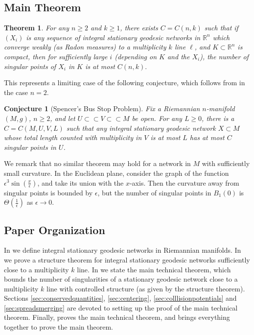 \documentclass[11pt,reqno,twoside]{amsart}
\newtheorem{theorem}[lemma]{Theorem}
\newtheorem{conjecture}[lemma]{Conjecture}
\theoremstyle{definition}
\begin{document}
\subsection{Main Theorem}

\begin{theorem} \label{maintheoremfinal}
    For any $n \geq 2$ and $k \geq 1$, there exists $C = C(n,k)$ such that if $(X_i)$ is any sequence of integral stationary geodesic networks in $\mathbb{R}^n$ which converge weakly (as Radon measures) to a multiplicity $k$ line $\ell$, and $K \subset \mathbb{R}^n$ is compact, then for sufficiently large $i$ (depending on $K$ and the $X_i$), the number of singular points of $X_i$ in $K$ is at most $C(n,k).$
\end{theorem}

This represents a limiting case of the following conjecture, which follows from \cite{frolov2026geodesicnetseuclideanplane} in the case $n=2$.

\begin{conjecture}[Spencer's Bus Stop Problem]
Fix a Riemannian $n$-manifold $(M,g)$, $n \geq 2$, and let $U \subset\subset V \subset\subset M$ be open. For any $L \geq 0$, there is a $C = C(M,U,V,L)$ such that any integral stationary geodesic network $X \subset M$ whose total length counted with multiplicity in $V$ is at most $L$ has at most $C$ singular points in $U$.
\end{conjecture}

We remark that no similar theorem may hold for a network in $M$ with sufficiently small curvature. In the Euclidean plane, consider the graph of the function $\epsilon^3 \sin(\frac{x}{\epsilon})$, and take its union with the $x$-axis. Then the curvature away from singular points is bounded by $\epsilon$, but the number of singular points in $B_1(0)$ is
$\Theta(\frac{1}{\epsilon})$ as $\epsilon \to 0.$

\subsection{Paper Organization} In  we define integral stationary geodesic networks in Riemannian manifolds. In  we prove a structure theorem for integral stationary geodesic networks sufficiently close to a multiplicity $k$ line. In  we state the main technical theorem, which bounds the number of singularities of a stationary geodesic network close to a multiplicity $k$ line with controlled structure (as given by the structure theorem). Sections \ref{sec:conservedquantities}, \ref{sec:centering}, \ref{sec:colllisionpotentials} and \ref{sec:spreadsmerging} are devoted to setting up the proof of the main technical theorem. Finally,  proves the main technical theorem, and  brings everything together to prove the main theorem.
\end{document}
